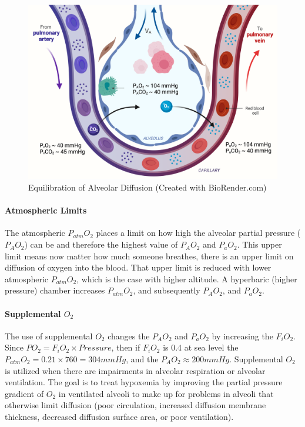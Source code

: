 \begin{figure}[!h]
    \centering
    \includegraphics[width=1.0\linewidth]{./figure/alveolar_equilibration.png}
    \caption{Equilibration of Alveolar Diffusion \footnotesize{(Created with BioRender.com)}}
    \label{fig:alveolar_equilibration}
\end{figure}

\paragraph{Atmospheric Limits}

The atmospheric $P_{atm}O_2$ places a limit on how high the alveolar partial pressure ($P_AO_2$) can be and therefore the highest value of $P_AO_2$ and $P_aO_2$. This upper limit means now matter how much someone breathes, there is an upper limit on diffusion of oxygen into the blood. That upper limit is reduced with lower atmospheric $P_{atm}O_2$, which is the case with higher altitude. A hyperbaric (higher pressure) chamber increases $P_{atm}O_2$, and subsequently $P_AO_2$, and $P_aO_2$. 

\paragraph{Supplemental $O_2$}
The use of supplemental $O_2$ changes the $P_AO_2$ and $P_aO_2$ by increasing the $F_iO_2$. Since $PO_2 = F_iO_2 \times Pressure$, then if $F_iO_2$ is 0.4 at sea level the $P_{atm}O_2 = 0.21 \times 760 = 304 mmHg$, and the $P_AO_2 \approx 200 mmHg$. Supplemental $O_2$ is utilized when there are impairments in alveolar respiration or alveolar ventilation. The goal is to treat hypoxemia by improving the partial pressure gradient of $O_2$ in ventilated alveoli to make up for problems in alveoli that otherwise limit diffusion (poor circulation, increased diffusion membrane thickness, decreased diffusion surface area, or poor ventilation). 

